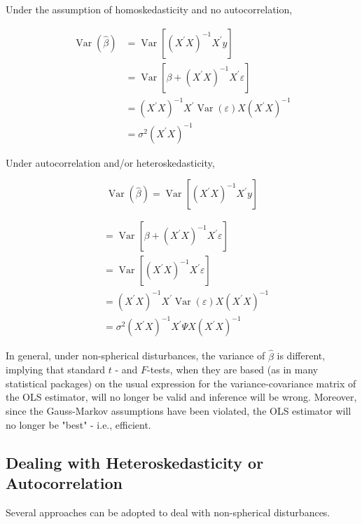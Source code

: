 Under the assumption of homoskedasticity and no autocorrelation,

$$
\begin{aligned}
\operatorname{Var}(\widehat{\beta}) & =\operatorname{Var}\left[\left(X^{\prime} X\right)^{-1} X^{\prime} y\right] \\
& =\operatorname{Var}\left[\beta+\left(X^{\prime} X\right)^{-1} X^{\prime} \varepsilon\right] \\
& =\left(X^{\prime} X\right)^{-1} X^{\prime} \operatorname{Var}(\varepsilon) X\left(X^{\prime} X\right)^{-1} \\
& =\sigma^{2}\left(X^{\prime} X\right)^{-1}
\end{aligned}
$$

Under autocorrelation and/or heteroskedasticity,

$$
\operatorname{Var}(\widehat{\beta})=\operatorname{Var}\left[\left(X^{\prime} X\right)^{-1} X^{\prime} y\right]
$$

$$
\begin{aligned}
& =\operatorname{Var}\left[\beta+\left(X^{\prime} X\right)^{-1} X^{\prime} \varepsilon\right] \\
& =\operatorname{Var}\left[\left(X^{\prime} X\right)^{-1} X^{\prime} \varepsilon\right] \\
& =\left(X^{\prime} X\right)^{-1} X^{\prime} \operatorname{Var}(\varepsilon) X\left(X^{\prime} X\right)^{-1} \\
& =\sigma^{2}\left(X^{\prime} X\right)^{-1} X^{\prime} \Psi X\left(X^{\prime} X\right)^{-1}
\end{aligned}
$$

In general, under non-spherical disturbances, the variance of $\widehat{\beta}$ is different, implying that standard $t$ - and $F$-tests, when they are based (as in many statistical packages) on the usual expression for the variance-covariance matrix of the OLS estimator, will no longer be valid and inference will be wrong. Moreover, since the Gauss-Markov assumptions have been violated, the OLS estimator will no longer be "best" - i.e., efficient.

\subsection{Dealing with Heteroskedasticity or Autocorrelation}
Several approaches can be adopted to deal with non-spherical disturbances.

